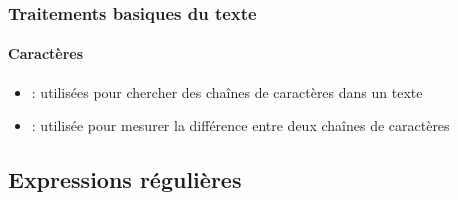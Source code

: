 \documentclass[xcolor=table]{beamer}
\begin{document}
\begin{frame}
\frametitle{Traitements basiques du texte}
\framesubtitle{Caractères}

\begin{itemize}
	\item {} : utilisées pour chercher des chaînes de caractères dans un texte
	\item {} : utilisée pour mesurer la différence entre deux chaînes de caractères 
\end{itemize}


\end{frame}

\subsection{Expressions régulières}
\end{document}
